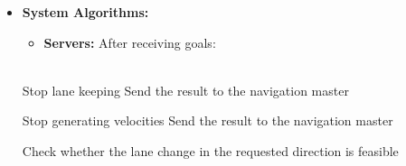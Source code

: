 \begin{itemize}
\begin{enumerate}
\begin{enumerate}
                \end{enumerate}
    \item \textbf{Feedback}: If the control action is feasible or not.
    \item \textbf{Result}: If the control action is completed or not due to infeasibility.
        \end{enumerate}
        \item \textbf{System Algorithms: }
        \begin{itemize}     
            \item \textbf{Servers: }
            After receiving goals: 
                \\ \\
        \end{itemize}
            \begin{algorithm}[H]
                \SetAlgoLined
                Stop lane keeping\;
                Send the result to the navigation master\;
                \caption{Lane Keeping Server Algorithm}
            \end{algorithm}
            \begin{algorithm}[H]
                \SetAlgoLined
                Stop generating velocities\;
                Send the result to the navigation master\;
                \caption{Velocity Controlling Server Algorithm}
            \end{algorithm}
            \begin{algorithm}[H]
                \SetAlgoLined
                Check whether the lane change in the requested direction is feasible\;

\end{algorithm}
\end{itemize}
